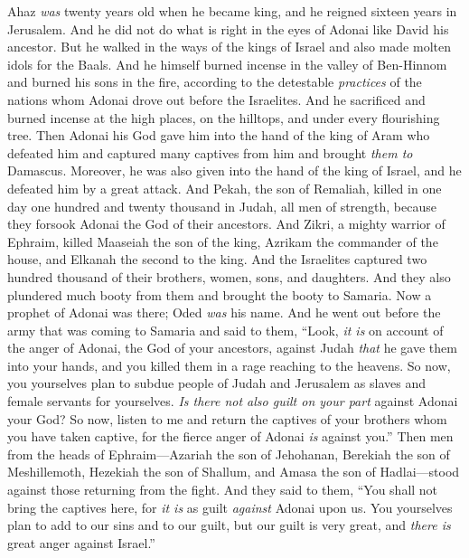 \begin{biblechapter} %
 Ahaz \textit{was} twenty years old when he became king, and he reigned sixteen years in Jerusalem. And he did not do what is right in the eyes of Adonai like David his ancestor.
\verse But he walked in the ways of the kings of Israel and also made molten idols for the Baals.
\verse And he himself burned incense in the valley of Ben-Hinnom and burned his sons in the fire, according to the detestable \textit{practices} of the nations whom Adonai drove out before the Israelites.
\verse And he sacrificed and burned incense at the high places, on the hilltops, and under every flourishing tree.
\verse Then Adonai his God gave him into the hand of the king of Aram who defeated him and captured many captives from him and brought \textit{them to} Damascus. Moreover, he was also given into the hand of the king of Israel, and he defeated him by a great attack.
\verse And Pekah, the son of Remaliah, killed in one day one hundred and twenty thousand in Judah, all men of strength, because they forsook Adonai the God of their ancestors.
\verse And Zikri, a mighty warrior of Ephraim, killed Maaseiah the son of the king, Azrikam the commander of the house, and Elkanah the second to the king.
\verse And the Israelites captured two hundred thousand of their brothers, women, sons, and daughters. And they also plundered much booty from them and brought the booty to Samaria.
\verse Now a prophet of Adonai was there; Oded \textit{was} his name. And he went out before the army that was coming to Samaria and said to them, “Look, \textit{it is} on account of the anger of Adonai, the God of your ancestors, against Judah \textit{that} he gave them into your hands, and you killed them in a rage reaching to the heavens.
\verse So now, you yourselves plan to subdue people of Judah and Jerusalem as slaves and female servants for yourselves. \textit{Is there not also guilt on your part} against Adonai your God?
\verse So now, listen to me and return the captives of your brothers whom you have taken captive, for the fierce anger of Adonai \textit{is} against you.”
\verse Then men from the heads of Ephraim—Azariah the son of Jehohanan, Berekiah the son of Meshillemoth, Hezekiah the son of Shallum, and Amasa the son of Hadlai—stood against those returning from the fight.
\verse And they said to them, “You shall not bring the captives here, for \textit{it is} as guilt \textit{against} Adonai upon us. You yourselves plan to add to our sins and to our guilt, but our guilt is very great, and \textit{there is} great anger against Israel.”

\end{biblechapter}
